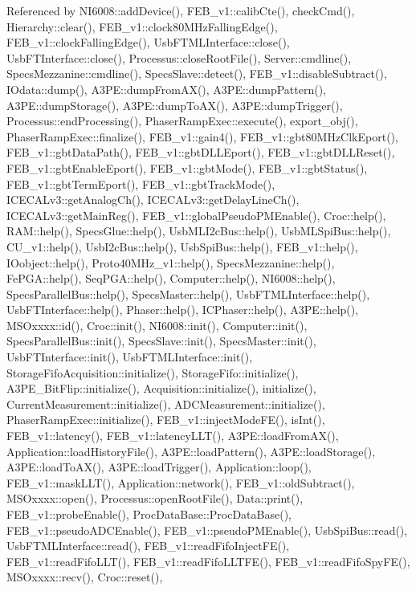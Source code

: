 Referenced by N\+I6008\+::add\+Device(), F\+E\+B\+\_\+v1\+::calib\+Cte(), check\+Cmd(), Hierarchy\+::clear(), F\+E\+B\+\_\+v1\+::clock80\+M\+Hz\+Falling\+Edge(), F\+E\+B\+\_\+v1\+::clock\+Falling\+Edge(), Usb\+F\+T\+M\+L\+Interface\+::close(), Usb\+F\+T\+Interface\+::close(), Processus\+::close\+Root\+File(), Server\+::cmdline(), Specs\+Mezzanine\+::cmdline(), Specs\+Slave\+::detect(), F\+E\+B\+\_\+v1\+::disable\+Subtract(), I\+Odata\+::dump(), A3\+P\+E\+::dump\+From\+A\+X(), A3\+P\+E\+::dump\+Pattern(), A3\+P\+E\+::dump\+Storage(), A3\+P\+E\+::dump\+To\+A\+X(), A3\+P\+E\+::dump\+Trigger(), Processus\+::end\+Processing(), Phaser\+Ramp\+Exec\+::execute(), export\+\_\+obj(), Phaser\+Ramp\+Exec\+::finalize(), F\+E\+B\+\_\+v1\+::gain4(), F\+E\+B\+\_\+v1\+::gbt80\+M\+Hz\+Clk\+Eport(), F\+E\+B\+\_\+v1\+::gbt\+Data\+Path(), F\+E\+B\+\_\+v1\+::gbt\+D\+L\+L\+Eport(), F\+E\+B\+\_\+v1\+::gbt\+D\+L\+L\+Reset(), F\+E\+B\+\_\+v1\+::gbt\+Enable\+Eport(), F\+E\+B\+\_\+v1\+::gbt\+Mode(), F\+E\+B\+\_\+v1\+::gbt\+Status(), F\+E\+B\+\_\+v1\+::gbt\+Term\+Eport(), F\+E\+B\+\_\+v1\+::gbt\+Track\+Mode(), I\+C\+E\+C\+A\+Lv3\+::get\+Analog\+Ch(), I\+C\+E\+C\+A\+Lv3\+::get\+Delay\+Line\+Ch(), I\+C\+E\+C\+A\+Lv3\+::get\+Main\+Reg(), F\+E\+B\+\_\+v1\+::global\+Pseudo\+P\+M\+Enable(), Croc\+::help(), R\+A\+M\+::help(), Specs\+Glue\+::help(), Usb\+M\+L\+I2c\+Bus\+::help(), Usb\+M\+L\+Spi\+Bus\+::help(), C\+U\+\_\+v1\+::help(), Usb\+I2c\+Bus\+::help(), Usb\+Spi\+Bus\+::help(), F\+E\+B\+\_\+v1\+::help(), I\+Oobject\+::help(), Proto40\+M\+Hz\+\_\+v1\+::help(), Specs\+Mezzanine\+::help(), Fe\+P\+G\+A\+::help(), Seq\+P\+G\+A\+::help(), Computer\+::help(), N\+I6008\+::help(), Specs\+Parallel\+Bus\+::help(), Specs\+Master\+::help(), Usb\+F\+T\+M\+L\+Interface\+::help(), Usb\+F\+T\+Interface\+::help(), Phaser\+::help(), I\+C\+Phaser\+::help(), A3\+P\+E\+::help(), M\+S\+Oxxxx\+::id(), Croc\+::init(), N\+I6008\+::init(), Computer\+::init(), Specs\+Parallel\+Bus\+::init(), Specs\+Slave\+::init(), Specs\+Master\+::init(), Usb\+F\+T\+Interface\+::init(), Usb\+F\+T\+M\+L\+Interface\+::init(), Storage\+Fifo\+Acquisition\+::initialize(), Storage\+Fifo\+::initialize(), A3\+P\+E\+\_\+\+Bit\+Flip\+::initialize(), Acquisition\+::initialize(), initialize(), Current\+Measurement\+::initialize(), A\+D\+C\+Measurement\+::initialize(), Phaser\+Ramp\+Exec\+::initialize(), F\+E\+B\+\_\+v1\+::inject\+Mode\+F\+E(), is\+Int(), F\+E\+B\+\_\+v1\+::latency(), F\+E\+B\+\_\+v1\+::latency\+L\+L\+T(), A3\+P\+E\+::load\+From\+A\+X(), Application\+::load\+History\+File(), A3\+P\+E\+::load\+Pattern(), A3\+P\+E\+::load\+Storage(), A3\+P\+E\+::load\+To\+A\+X(), A3\+P\+E\+::load\+Trigger(), Application\+::loop(), F\+E\+B\+\_\+v1\+::mask\+L\+L\+T(), Application\+::network(), F\+E\+B\+\_\+v1\+::old\+Subtract(), M\+S\+Oxxxx\+::open(), Processus\+::open\+Root\+File(), Data\+::print(), F\+E\+B\+\_\+v1\+::probe\+Enable(), Proc\+Data\+Base\+::\+Proc\+Data\+Base(), F\+E\+B\+\_\+v1\+::pseudo\+A\+D\+C\+Enable(), F\+E\+B\+\_\+v1\+::pseudo\+P\+M\+Enable(), Usb\+Spi\+Bus\+::read(), Usb\+F\+T\+M\+L\+Interface\+::read(), F\+E\+B\+\_\+v1\+::read\+Fifo\+Inject\+F\+E(), F\+E\+B\+\_\+v1\+::read\+Fifo\+L\+L\+T(), F\+E\+B\+\_\+v1\+::read\+Fifo\+L\+L\+T\+F\+E(), F\+E\+B\+\_\+v1\+::read\+Fifo\+Spy\+F\+E(), M\+S\+Oxxxx\+::recv(), Croc\+::reset(), 